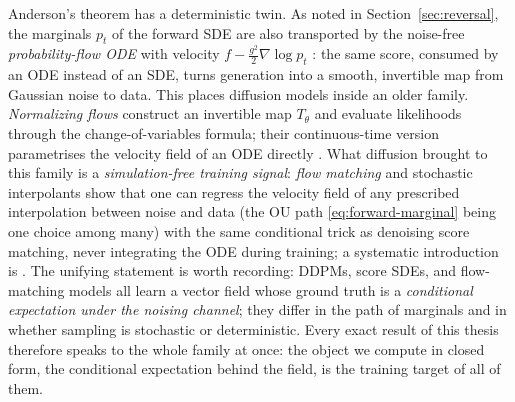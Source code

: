 Anderson's theorem has a deterministic twin. As noted in
Section~\ref{sec:reversal}, the marginals $p_t$ of the forward SDE are
also transported by the noise-free \emph{probability-flow ODE} with
velocity $f - \tfrac{g^2}{2}\nabla \log p_t$ \citep{song2021scorebased}:
the same score, consumed by an ODE instead of an SDE, turns generation
into a smooth, invertible map from Gaussian noise to data. This places
diffusion models inside an older family. \emph{Normalizing flows}
\citep{rezende2015variational, papamakarios2021normalizing} construct an
invertible map $T_\theta$ and evaluate likelihoods through the
change-of-variables formula; their continuous-time version parametrises
the velocity field of an ODE directly \citep{chen2018neural}. What
diffusion brought to this family is a \emph{simulation-free training
signal}: \emph{flow matching} \citep{lipman2023flow} and stochastic
interpolants \citep{albergo2023building} show that one can regress the
velocity field of any prescribed interpolation between noise and data
(the OU path \eqref{eq:forward-marginal} being one choice among many)
with the same conditional trick as denoising score matching, never
integrating the ODE during training; a systematic introduction is
\citet{holderrieth2025flow}. The unifying statement is worth recording:
DDPMs, score SDEs, and flow-matching models all learn a vector field
whose ground truth is a \emph{conditional expectation under the noising
channel}; they differ in the path of marginals and in whether sampling is
stochastic or deterministic. Every exact result of this thesis therefore
speaks to the whole family at once: the object we compute in closed form,
the conditional expectation behind the field, is the training target of
all of them.

